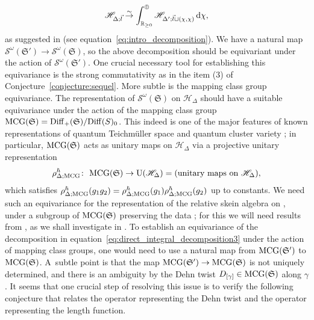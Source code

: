 \documentclass[pdftex]{sigma}
\numberwithin{equation}{section}
\theoremstyle{definition}
\begin{document}
\begin{align}
\label{eq:direct_integral_decomposition3}
\mathscr{H}_{\Delta;\vec{l}} \stackrel{\sim}{\to} \int_{ \mathbb{R}_{\ge 0} }^\oplus \mathscr{H}_{\Delta'; \vec{l}\sqcup(\chi,\chi)} \, {\rm d}\chi,
\end{align}
as suggested in \cite{FG09} (see equation~\eqref{eq:intro_decomposition}). We have a natural map $\mathcal{S}^\omega(\mathfrak{S}') \to \mathcal{S}^\omega(\mathfrak{S})$, so the above decomposition should be equivariant under the action of $\mathcal{S}^\omega(\mathfrak{S}')$. One crucial necessary tool for establishing this equivariance is the strong commutativity as in the item (3) of Conjecture~\ref{conjecture:sequel}. More subtle is the mapping class group equivariance. The representation of $\mathcal{S}^\omega(\mathfrak{S})$ on $\mathscr{H}_\Delta$ should have a suitable equivariance under the action of the mapping class group ${\rm MCG}(\mathfrak{S}) = {\rm Diff}_+(\mathfrak{S})/{\rm Diff}(S)_0$. This indeed is one of the major features of known representations of quantum Teichm\"uller space \cite{F97,CF,Kash98} and quantum cluster variety \cite{FG09}; in particular, ${\rm MCG}(\mathfrak{S})$ acts as unitary maps on $\mathscr{H}_\Delta$ via a projective unitary representation
\[
\rho^\hbar_{\Delta;{\rm MCG}} \colon \ {\rm MCG}(\mathfrak{S}) \to {\rm U}(\mathscr{H}_\Delta) = \mbox{(unitary maps on $\mathscr{H}_\Delta$)},
\]
which satisfies $\rho^\hbar_{\Delta;{\rm MCG}}(g_1g_2) = \rho^\hbar_{\Delta;{\rm MCG}}(g_1)\rho^\hbar_{\Delta;{\rm MCG}}(g_2)$ up to constants. We need such an equivariance for the representation of the relative skein algebra  on , under a subgroup of ${\rm MCG}(\mathfrak{S})$ preserving the data ; for this we will need results from \cite{Kim_irreducible}, as we shall investigate in \cite{sequel}. To establish an equivariance of the decomposition in equation~\eqref{eq:direct_integral_decomposition3} under the action of mapping class groups, one would need to use a natural map from ${\rm MCG}(\mathfrak{S}')$ to ${\rm MCG}(\mathfrak{S})$. A~subtle point is that the map ${\rm MCG}(\mathfrak{S}') \to {\rm MCG}(\mathfrak{S})$ is not uniquely determined, and there is an ambiguity by the Dehn twist $D_{[\gamma]} \in {\rm MCG}(\mathfrak{S})$ along $\gamma$. It seems that one crucial step of resolving this issue is to verify the following conjecture that relates the operator representing the Dehn twist and the operator representing the length function.
\end{document}
